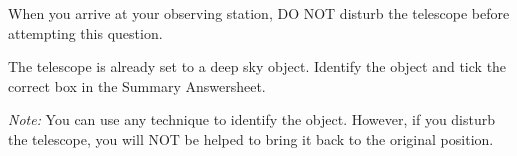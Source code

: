 When you arrive at your observing station, DO NOT disturb the telescope
before attempting this question.

The telescope is already set to a deep sky object. Identify the object and
tick the correct box in the Summary Answersheet.

\emph{Note:} You can use any technique to identify the object. However, if
you disturb the telescope, you will NOT be helped to bring it back to the
original position.
